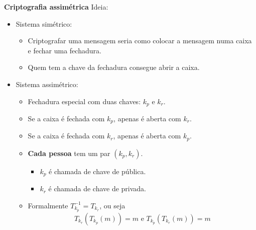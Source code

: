 \documentclass[12pt]{beamer}
\begin{document}
\begin{frame}
{\bf \large Criptografia assimétrica}
Ideia:
\begin{itemize}
  \item Sistema simétrico:
    \begin{itemize}
      \item Criptografar uma mensagem seria como colocar a mensagem numa caixa
       e fechar uma fechadura.
       \item Quem tem a chave da fechadura consegue abrir a caixa.
    \end{itemize}
  \item Sistema assimétrico:
    \begin{itemize}
      \item Fechadura especial com duas chaves: $k_p$ e $k_r$.
      \item Se a caixa é fechada com $k_p$, apenas é aberta com $k_r$.
      \item Se a caixa é fechada com $k_r$, apenas é aberta com $k_p$.
      \item {\bf Cada pessoa} tem um par $(k_p,k_r)$.
        \begin{itemize}
          \item $k_p$ é chamada de chave de pública.
          \item $k_r$ é chamada de chave de privada.
        \end{itemize}
      \item Formalmente $T_{k_p}^{-1} = T_{k_r}$, ou seja
      $$
        T_{k_r} ( T_{k_p}(m)) = m \text{ e } T_{k_p} ( T_{k_r}(m)) = m
      $$
    \end{itemize}
\end{itemize}
\end{frame}
\end{document}
